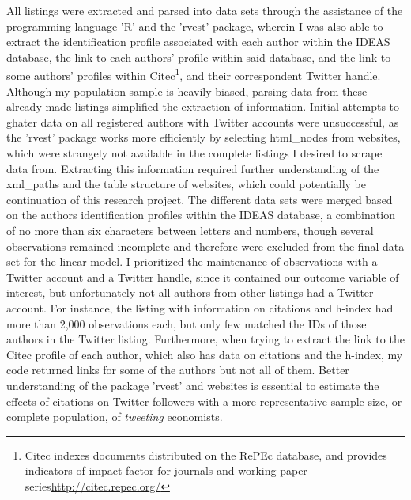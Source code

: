 \documentclass[12pt,english]{article}
\begin{document}
All listings were extracted and parsed into data sets through the assistance of the programming language 'R' and the 'rvest' package, wherein I was also able to extract the identification profile associated with each author within the IDEAS database, the link to each authors' profile within said database, and the link to some authors' profiles within Citec\footnote{Citec indexes documents distributed on the RePEc database, and provides indicators of impact factor for journals and working paper series\url{http://citec.repec.org/}}, and their correspondent Twitter handle. Although my population sample is heavily biased, parsing data from these already-made listings simplified the extraction of information. Initial attempts to ghater data on all registered authors with Twitter accounts were unsuccessful, as the 'rvest' package works more efficiently by selecting html\_nodes from websites, which were strangely not available in the complete listings I desired to scrape data from. Extracting this information required further understanding of the xml\_paths and the table structure of websites, which could potentially be continuation of this research project. The different data sets were merged based on the authors identification profiles within the IDEAS database, a combination of no more than six characters between letters and numbers, though several observations remained incomplete and therefore were excluded from the final data set for the linear model. I prioritized the maintenance of observations with a Twitter account and a Twitter handle, since it contained our outcome variable of interest, but unfortunately not all authors from other listings had a Twitter account. For instance, the listing with information on citations and h-index had more than 2,000 observations each, but only few matched the IDs of those authors in the Twitter listing. Furthermore, when trying to extract the link to the Citec profile of each author, which also has data on citations and the h-index, my code returned links for some of the authors but not all of them. Better understanding of the package 'rvest' and websites is essential to estimate the effects of citations on Twitter followers with a more representative sample size, or complete population, of \textit{tweeting} economists. 
\end{document}
